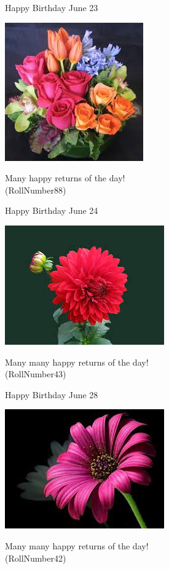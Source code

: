 \documentclass[table, landscape]{beamer}
\begin{document}
\begin{frame}{\color{red}Happy Birthday }
{June 23}
\begin{center}
\includegraphics[height=0.5\textheight]{flowers/f9.jpeg}

Many happy returns of the day! \\ \vspace{0.5cm}{\Large name81} (RollNumber88)
\end{center}
\end{frame}
\begin{frame}{\color{blue}Happy Birthday }
{June 24}
\begin{center}
\includegraphics[height=0.5\textheight]{flowers/f1.jpeg}

Many many happy returns of the day! \\ \vspace{0.5cm}{\Large name36} (RollNumber43)
\end{center}
\end{frame}
\begin{frame}{\color{blue}Happy Birthday }
{June 28}
\begin{center}
\includegraphics[height=0.5\textheight]{flowers/f2.jpeg}

Many many happy returns of the day! \\ \vspace{0.5cm}{\Large name35} (RollNumber42)
\end{center}
\end{frame}
\end{document}
